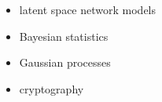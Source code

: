 
\begin{itemize}
    \item latent space network models
    \item Bayesian statistics
    \item Gaussian processes
    \item cryptography
\end{itemize}



